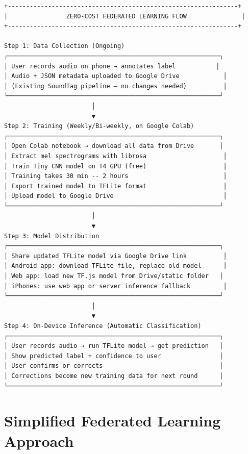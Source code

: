 \documentclass[11pt,a4paper]{article}
\begin{document}
\begin{verbatim}
+---------------------------------------------------------------+
|                ZERO-COST FEDERATED LEARNING FLOW               |
+---------------------------------------------------------------+

Step 1: Data Collection (Ongoing)
┌──────────────────────────────────────────────────────────┐
│ User records audio on phone → annotates label           │
│ Audio + JSON metadata uploaded to Google Drive            │
│ (Existing SoundTag pipeline — no changes needed)          │
└──────────────────────────────────────────────────────────┘
                        │
                        ▼
Step 2: Training (Weekly/Bi-weekly, on Google Colab)
┌──────────────────────────────────────────────────────────┐
│ Open Colab notebook → download all data from Drive       │
│ Extract mel spectrograms with librosa                     │
│ Train Tiny CNN model on T4 GPU (free)                     │
│ Training takes 30 min -- 2 hours                          │
│ Export trained model to TFLite format                     │
│ Upload model to Google Drive                              │
└──────────────────────────────────────────────────────────┘
                        │
                        ▼
Step 3: Model Distribution
┌──────────────────────────────────────────────────────────┐
│ Share updated TFLite model via Google Drive link          │
│ Android app: download TFLite file, replace old model      │
│ Web app: load new TF.js model from Drive/static folder   │
│ iPhones: use web app or server inference fallback         │
└──────────────────────────────────────────────────────────┘
                        │
                        ▼
Step 4: On-Device Inference (Automatic Classification)
┌──────────────────────────────────────────────────────────┐
│ User records audio → run TFLite model → get prediction   │
│ Show predicted label + confidence to user                │
│ User confirms or corrects                                │
│ Corrections become new training data for next round      │
└──────────────────────────────────────────────────────────┘
\end{verbatim}

\section{Simplified Federated Learning Approach}
\end{document}
